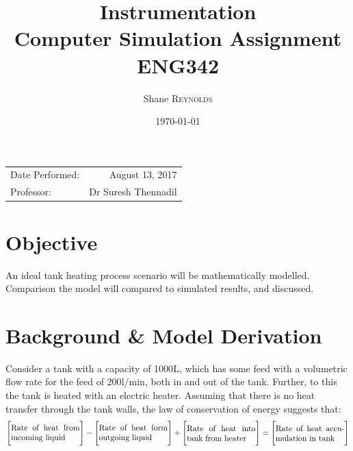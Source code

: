 \documentclass{article}
\title{Instrumentation \\ Computer Simulation Assignment \\ ENG342} %
\author{Shane \textsc{Reynolds}} %
\date{\today} %
\begin{document}
\maketitle %

\begin{center}
\begin{tabular}{l r}
Date Performed: & August 13, 2017 \\ %
Professor: & Dr Suresh Thennadil %
\end{tabular}
\end{center}


\tableofcontents
\newpage


\section{Objective}

An ideal tank heating process scenario will be mathematically modelled. Comparison the model will compared to simulated results, and discussed.


\section{Background \& Model Derivation}
Consider a tank with a capacity of 1000$\si{\liter}$, which has some feed with a volumetric flow rate for the feed of 200$\si{\litre\per\minute}$, both in and out of the tank. Further, to this the tank is heated with an electric heater. Assuming that there is no heat transfer through the tank walls, the law of conservation of energy suggests that:
\begin{align}
\Bigg[\parbox{3cm}{Rate of heat from incoming liquid}\Bigg] - \Bigg[\parbox{3cm}{Rate of heat form outgoing liquid}\Bigg] + \Bigg[\parbox{3cm}{Rate of heat into tank from heater}\Bigg] = \Bigg[\parbox{3cm}{Rate of heat accumulation in tank}\Bigg]
\end{align}
\end{document}
